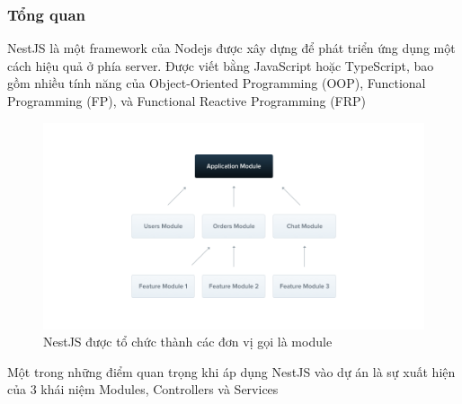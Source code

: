 \subsubsection{Tổng quan}
\hspace*{1cm} NestJS là một framework của Nodejs được xây dựng để phát triển ứng dụng một cách hiệu quả ở phía server. Được viết bằng JavaScript hoặc TypeScript, bao gồm nhiều tính năng của Object-Oriented Programming (OOP), Functional Programming (FP), và Functional Reactive Programming (FRP)\cite{nestjs}
\begin{figure}[H]
        \centering
        \includegraphics[width=1\textwidth]{Images/technology/module-nestjs.png}
        \caption{NestJS được tổ chức thành các đơn vị gọi là module}
    \end{figure}
Một trong những điểm quan trọng khi áp dụng NestJS vào dự án là sự xuất hiện của 3 khái niệm Modules, Controllers và Services
